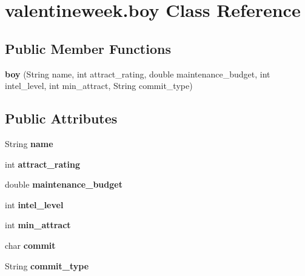 \hypertarget{classvalentineweek_1_1boy}{}\section{valentineweek.\+boy Class Reference}
\label{classvalentineweek_1_1boy}
\subsection*{Public Member Functions}
\begin{DoxyCompactItemize}
\item 
\mbox{\label{classvalentineweek_1_1boy_aac26b1f81ec39ee3dc208faf346c2068}} 
{\bfseries boy} (String name, int attract\+\_\+rating, double maintenance\+\_\+budget, int intel\+\_\+level, int min\+\_\+attract, String commit\+\_\+type)
\end{DoxyCompactItemize}
\subsection*{Public Attributes}
\begin{DoxyCompactItemize}
\item 
\mbox{\label{classvalentineweek_1_1boy_ab8c969ce57d417520d5f9ac3f8a7d292}} 
String {\bfseries name}
\item 
\mbox{\label{classvalentineweek_1_1boy_ae892bbbf194bdc4aee3f0bb92a7b0bae}} 
int {\bfseries attract\+\_\+rating}
\item 
\mbox{\label{classvalentineweek_1_1boy_ab16b59db23d506d03c362967d8a791bf}} 
double {\bfseries maintenance\+\_\+budget}
\item 
\mbox{\label{classvalentineweek_1_1boy_a30f831aeea8f3cb1428143851fa29651}} 
int {\bfseries intel\+\_\+level}
\item 
\mbox{\label{classvalentineweek_1_1boy_abd97a8693d236d698d91c244f351fd69}} 
int {\bfseries min\+\_\+attract}
\item 
\mbox{\label{classvalentineweek_1_1boy_aa3c5ca0a810600ea04df897a5096ce8b}} 
char {\bfseries commit}
\item 
\mbox{\label{classvalentineweek_1_1boy_a5786823f667e498feb6e5bcf2b44aa23}} 
String {\bfseries commit\+\_\+type}
\end{DoxyCompactItemize}


